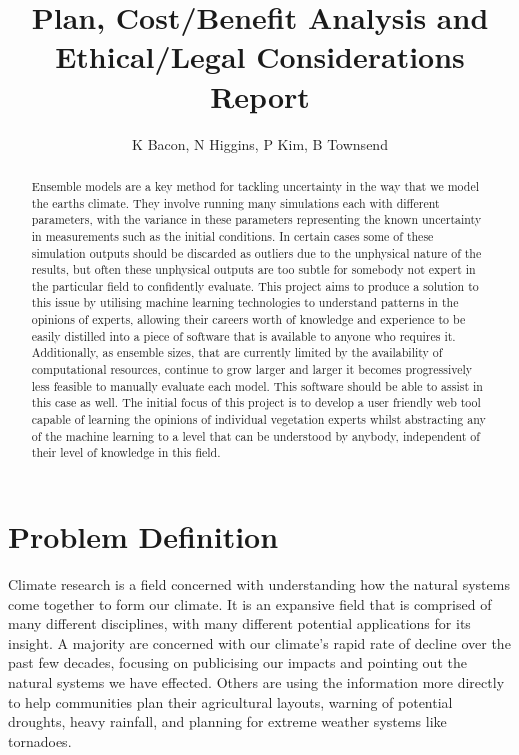 \documentclass{ecmm427_assignment}
\begin{document}
\title{Plan, Cost/Benefit Analysis and Ethical/Legal Considerations Report}
\author{K Bacon, N Higgins, P Kim, B Townsend}
\maketitle

\begin{abstract}
Ensemble models are a key method for tackling uncertainty in the way that we model the earths climate. They involve running many simulations each with different parameters, with the variance in these parameters representing the known uncertainty in measurements such as the initial conditions. In certain cases some of these simulation outputs should be discarded as outliers due to the unphysical nature of the results, but often these unphysical outputs are too subtle for somebody not expert in the particular field to confidently evaluate. This project aims to produce a solution to this issue by utilising machine learning technologies to understand patterns in the opinions of experts, allowing their careers worth of knowledge and experience to be easily distilled into a piece of software that is available to anyone who requires it. Additionally, as ensemble sizes, that are currently limited by the availability of computational resources, continue to grow larger and larger it becomes progressively less feasible to manually evaluate each model. This software should be able to assist in this case as well. The initial focus of this project is to develop a user friendly web tool capable of learning the opinions of individual vegetation experts whilst abstracting any of the machine learning to a level that can be understood by anybody, independent of their level of knowledge in this field. 
\end{abstract}

\declaration
\newpage %

\tableofcontents

\newpage

\section{Problem Definition}

Climate research is a field concerned with understanding how the natural systems come together to form our climate. It is an expansive field that is comprised of many different disciplines, with many different potential applications for its insight. A majority are concerned with our climate's rapid rate of decline over the past few decades, focusing on publicising our impacts and pointing out the natural systems we have effected. Others are using the information more directly to help communities plan their agricultural layouts, warning of potential droughts, heavy rainfall, and planning for extreme weather systems like tornadoes.
\end{document}
